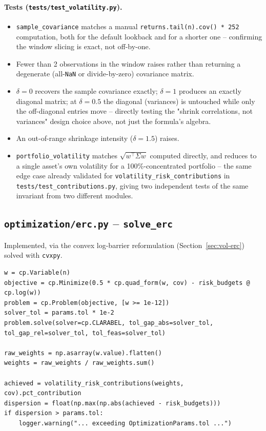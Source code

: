 \documentclass[11pt]{article}
\begin{document}
\paragraph{Tests (\texttt{tests/test\_volatility.py}).}
\begin{itemize}
    \item \texttt{sample\_covariance} matches a manual
    \texttt{returns.tail(n).cov() * 252} computation, both for the
    default lookback and for a shorter one -- confirming the window
    slicing is exact, not off-by-one.
    \item Fewer than 2 observations in the window raises rather than
    returning a degenerate (all-\texttt{NaN} or divide-by-zero)
    covariance matrix.
    \item $\delta = 0$ recovers the sample covariance exactly;
    $\delta = 1$ produces an exactly diagonal matrix; at $\delta = 0.5$
    the diagonal (variances) is untouched while only the off-diagonal
    entries move -- directly testing the "shrink correlations, not
    variances" design choice above, not just the formula's algebra.
    \item An out-of-range shrinkage intensity ($\delta = 1.5$) raises.
    \item \texttt{portfolio\_volatility} matches
    $\sqrt{w^\top \Sigma w}$ computed directly, and reduces to a single
    asset's own volatility for a 100\%-concentrated portfolio -- the same
    edge case already validated for
    \texttt{volatility\_risk\_contributions} in
    \texttt{tests/test\_contributions.py}, giving two independent tests
    of the same invariant from two different modules.
\end{itemize}

\subsection{\texttt{optimization/erc.py} -- \texttt{solve\_erc}}

Implemented, via the convex log-barrier reformulation
(Section~\ref{sec:vol-erc}) solved with \texttt{cvxpy}.

\begin{lstlisting}
w = cp.Variable(n)
objective = cp.Minimize(0.5 * cp.quad_form(w, cov) - risk_budgets @ cp.log(w))
problem = cp.Problem(objective, [w >= 1e-12])
solver_tol = params.tol * 1e-2
problem.solve(solver=cp.CLARABEL, tol_gap_abs=solver_tol, tol_gap_rel=solver_tol, tol_feas=solver_tol)

raw_weights = np.asarray(w.value).flatten()
weights = raw_weights / raw_weights.sum()

achieved = volatility_risk_contributions(weights, cov).pct_contribution
dispersion = float(np.max(np.abs(achieved - risk_budgets)))
if dispersion > params.tol:
    logger.warning("... exceeding OptimizationParams.tol ...")
\end{lstlisting}
\end{document}
